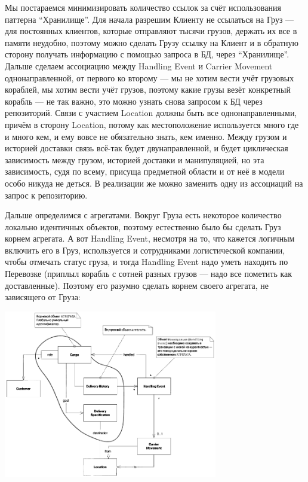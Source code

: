 \documentclass[a5paper]{article}
\begin{document}
Мы постараемся минимизировать количество ссылок за счёт использования паттерна ``Хранилище''. Для начала разрешим Клиенту не ссылаться на Груз --- для постоянных клиентов, которые отправляют тысячи грузов, держать их все в памяти неудобно, поэтому можно сделать Грузу ссылку на Клиент и в обратную сторону получать информацию с помощью запроса в БД, через ``Хранилище''. Дальше сделаем ассоциацию между Handling Event и Carrier Movement однонаправленной, от первого ко второму --- мы не хотим вести учёт грузовых кораблей, мы хотим вести учёт грузов, поэтому какие грузы везёт конкретный корабль --- не так важно, это можно узнать снова запросом к БД через репозиторий. Связи с участием Location должны быть все однонаправленными, причём в сторону Location, потому как местоположение используется много где и много кем, и ему вовсе не обязательно знать, кем именно. Между грузом и историей доставки связь всё-так будет двунаправленной, и будет циклическая зависимость между грузом, историей доставки и манипуляцией, но эта зависимость, судя по всему, присуща предметной области и от неё в модели особо никуда не деться. В реализации же можно заменить одну из ассоциаций на запрос к репозиторию.

Дальше определимся с агрегатами. Вокруг Груза есть некоторое количество локально идентичных объектов, поэтому естественно было бы сделать Груз корнем агрегата. А вот Handling Event, несмотря на то, что кажется логичным включить его в Груз, используется и сотрудниками логистической компании, чтобы отмечать статус груза, и тогда Handling Event надо уметь находить по Перевозке (приплыл корабль с сотней разных грузов --- надо все пометить как доставленные). Поэтому его разумно сделать корнем своего агрегата, не зависящего от Груза:

\begin{center}
    \includegraphics[width=0.7\textwidth]{cargoAggregates.png}
\end{center}
\end{document}
